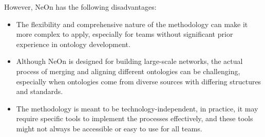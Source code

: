 However, NeOn has the following disadvantages:
\begin{itemize}
    \item The flexibility and comprehensive nature of the methodology can make it more complex to apply, especially for teams without significant prior experience in ontology development. 

    \item Although NeOn is designed for building large-scale networks, the actual process of merging and aligning different ontologies can be challenging, especially when ontologies come from diverse sources with differing structures and standards.

    \item The methodology is meant to be technology-independent, in practice, it may require specific tools to implement the processes effectively, and these tools might not always be accessible or easy to use for all teams.
\end{itemize}

